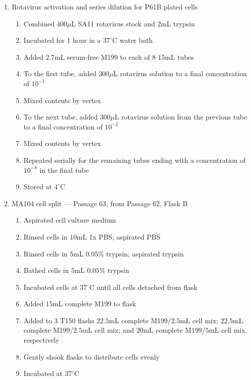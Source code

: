 \begin{enumerate}
	\item Rotavirus activation and series dilution for P61B plated cells
		\begin{enumerate}
			\item Combined $400\mu$L SA11 rotavirus stock and $2$mL trypsin
			\item Incubated for 1 hour in a $37^{\circ}$C water bath
			\item Added $2.7$mL serum-free M199 to each of 8 $15$mL tubes
			\item To the first tube, added $300\mu$L rotavirus solution to a final concentration of $10^{-1}$
			\item Mixed contents by vertex
			\item To the next tube, added $300\mu$L rotavirus solution from the previous tube to a final concentration of $10^{-2}$
			\item Mixed contents by vertex
			\item Repeated serially for the remaining tubes ending with a concentration of $10^{-8}$ in the final tube
			\item Stored at $4^{\circ}$C
		\end{enumerate}
	\item MA104 cell split --- Passage 63, from Passage 62, Flask B
		\begin{enumerate}
			\item Aspirated cell culture medium
			\item Rinsed cells in $10$mL 1x PBS; aspirated PBS
			\item Rinsed cells in $5$mL $0.05$\% trypsin; aspirated trypsin
			\item Bathed cells in $5$mL $0.05$\% trypsin
			\item Incubated cells at $37^{\circ}$C until all cells detached from flask
			\item Added $15$mL complete M199 to flask
			\item Added to $3$ T150 flasks $22.5$mL complete M199/$2.5$mL cell mix; $22.5$mL complete M199/$2.5$mL cell mix; and $20$mL complete M199/$5$mL cell mix, respectively
			\item Gently shook flasks to distribute cells evenly
			\item Incubated at $37^{\circ}$C
		\end{enumerate}
\end{enumerate}